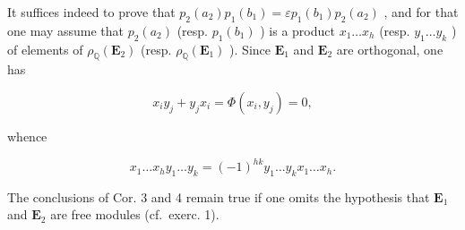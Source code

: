 It suffices indeed to prove that \(p_2(a_2)p_1(b_1) = \varepsilon p_1(b_1)p_2(a_2)\) , and for that one may assume that \(p_2(a_2)\) (resp. \(p_1(b_1)\) ) is a product \(x_1 \ldots x_h\) (resp. \(y_1 \ldots y_k\) ) of elements of \(\rho_{\mathbb{Q}}(\mathbf{E}_2)\) (resp. \(\rho_{\mathbb{Q}}(\mathbf{E}_1)\) ). Since \(\mathbf{E}_1\) and \(\mathbf{E}_2\) are orthogonal, one has

\[
x _ {i} y _ {j} + y _ {j} x _ {i} = \Phi (x _ {i}, y _ {j}) = 0,
\]

whence

\[
x _ {1} \dots x _ {h} y _ {1} \dots y _ {k} = (- 1) ^ {h k} y _ {1} \dots y _ {k} x _ {1} \dots x _ {h}.
\]

The conclusions of Cor. 3 and 4 remain true if one omits the hypothesis that \(\mathbf{E}_1\) and \(\mathbf{E}_2\) are free modules (cf.~exerc. 1).

